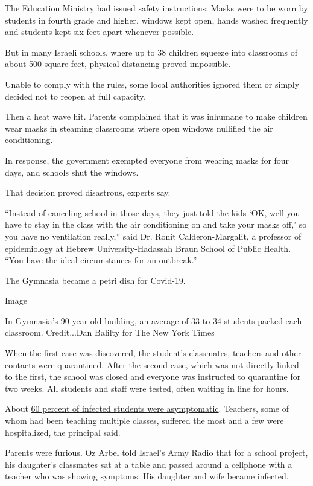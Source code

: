The Education Ministry had issued safety instructions: Masks were to be
worn by students in fourth grade and higher, windows kept open, hands
washed frequently and students kept six feet apart whenever possible.

But in many Israeli schools, where up to 38 children squeeze into
classrooms of about 500 square feet, physical distancing proved
impossible.

Unable to comply with the rules, some local authorities ignored them or
simply decided not to reopen at full capacity.

Then a heat wave hit. Parents complained that it was inhumane to make
children wear masks in steaming classrooms where open windows nullified
the air conditioning.

In response, the government exempted everyone from wearing masks for
four days, and schools shut the windows.

That decision proved disastrous, experts say.

``Instead of canceling school in those days, they just told the kids
`OK, well you have to stay in the class with the air conditioning on and
take your masks off,' so you have no ventilation really,'' said Dr.
Ronit Calderon-Margalit, a professor of epidemiology at Hebrew
University-Hadassah Braun School of Public Health. ``You have the ideal
circumstances for an outbreak.''

The Gymnasia became a petri dish for Covid-19.

Image

In Gymnasia's 90-year-old building, an average of 33 to 34 students
packed each classroom. Credit...Dan Balilty for The New York Times

When the first case was discovered, the student's classmates, teachers
and other contacts were quarantined. After the second case, which was
not directly linked to the first, the school was closed and everyone was
instructed to quarantine for two weeks. All students and staff were
tested, often waiting in line for hours.

About
\href{https://www.eurosurveillance.org/content/10.2807/1560-7917.ES.2020.25.29.2001352?mc_source=MTExMDY2Ojo6OTgxM2NkZDM4OGRjNGFlM2JhY2RhNWIyZTNlODhkOTE6OnYzOjoxNTk2NDc1MjIzOjox\#html_fulltext}{60
percent of infected students were asymptomatic}. Teachers, some of whom
had been teaching multiple classes, suffered the most and a few were
hospitalized, the principal said.

Parents were furious. Oz Arbel told Israel's Army Radio that for a
school project, his daughter's classmates sat at a table and passed
around a cellphone with a teacher who was showing symptoms. His daughter
and wife became infected.

